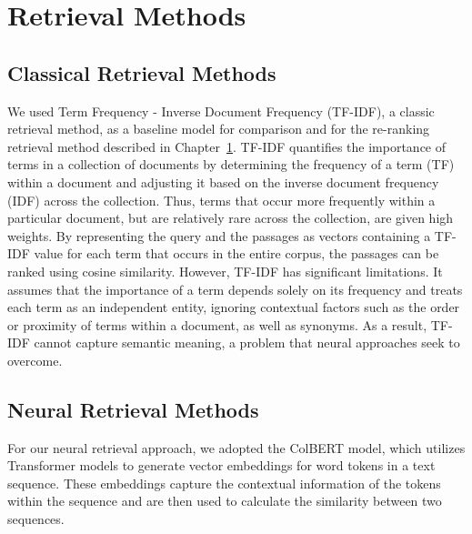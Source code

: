\documentclass[11pt]{article}
\begin{document}



\section{Retrieval Methods}
\label{chap:retrieval}
\subsection{Classical Retrieval Methods}
We used Term Frequency - Inverse Document Frequency (TF-IDF), a classic retrieval method, as a baseline model for comparison and for the re-ranking retrieval method described in Chapter~\ref{chap:retrieval}. TF-IDF quantifies the importance of terms in a collection of documents by determining the frequency of a term (TF) within a document and adjusting it based on the inverse document frequency (IDF) across the collection. Thus, terms that occur more frequently within a particular document, but are relatively rare across the collection, are given high weights. By representing the query and the passages as vectors containing a TF-IDF value for each term that occurs in the entire corpus, the passages can be ranked using cosine similarity. However, TF-IDF has significant limitations. It assumes that the importance of a term depends solely on its frequency and treats each term as an independent entity, ignoring contextual factors such as the order or proximity of terms within a document, as well as synonyms. As a result, TF-IDF cannot capture semantic meaning, a problem that neural approaches seek to overcome.

\subsection{Neural Retrieval Methods}
For our neural retrieval approach, we adopted the ColBERT \cite{khattab2020ColBERT} model, which utilizes Transformer models to generate vector embeddings for word tokens in a text sequence. These embeddings capture the contextual information of the tokens within the sequence and are then used to calculate the similarity between two sequences.
\end{document}
